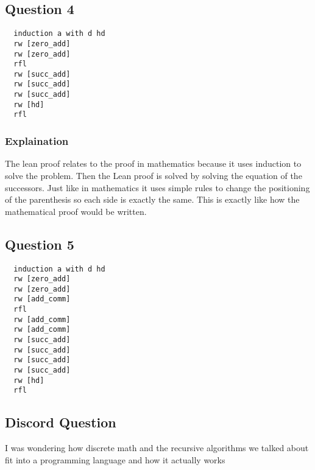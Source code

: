 \documentclass{article}
\theoremstyle{plain}
\theoremstyle{definition}
\theoremstyle{remark}
\begin{document}
\subsection{Question 4}

\begin{lstlisting}
  induction a with d hd
  rw [zero_add]
  rw [zero_add]
  rfl
  rw [succ_add]
  rw [succ_add]
  rw [succ_add]
  rw [hd]
  rfl
\end{lstlisting}

\subsubsection{Explaination}

The lean proof relates to the proof in mathematics because it uses induction to solve the problem. Then the Lean proof is solved by solving the equation of the successors. Just like in mathematics it uses simple rules to change the positioning of the parenthesis so each side is exactly the same. This is exactly like how the mathematical proof would be written.

\subsection{Question 5}

\begin{lstlisting}
  induction a with d hd
  rw [zero_add]
  rw [zero_add]
  rw [add_comm]
  rfl
  rw [add_comm]
  rw [add_comm]
  rw [succ_add]
  rw [succ_add]
  rw [succ_add]
  rw [succ_add]
  rw [hd]
  rfl
\end{lstlisting}

\subsection{Discord Question}

I was wondering how discrete math and the recursive algorithms we talked about fit into a programming language and how it actually works
\end{document}
